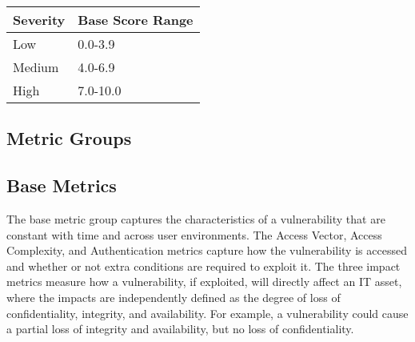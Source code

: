     \begin{longtable}[]{@{}ll@{}}
    \toprule
    \begin{minipage}[b]{0.14\columnwidth}\raggedright\strut
    Severity
    \strut\end{minipage} &
    \begin{minipage}[b]{0.25\columnwidth}\raggedright\strut
    Base Score Range
    \strut\end{minipage}\tabularnewline
    \midrule
    \endhead
    \begin{minipage}[t]{0.14\columnwidth}\raggedright\strut
    Low
    \strut\end{minipage} &
    \begin{minipage}[t]{0.25\columnwidth}\raggedright\strut
    0.0-3.9
    \strut\end{minipage}\tabularnewline
    \begin{minipage}[t]{0.14\columnwidth}\raggedright\strut
    Medium
    \strut\end{minipage} &
    \begin{minipage}[t]{0.25\columnwidth}\raggedright\strut
    4.0-6.9
    \strut\end{minipage}\tabularnewline
    \begin{minipage}[t]{0.14\columnwidth}\raggedright\strut
    High
    \strut\end{minipage} &
    \begin{minipage}[t]{0.25\columnwidth}\raggedright\strut
    7.0-10.0
    \strut\end{minipage}\tabularnewline
    \bottomrule
    \end{longtable}

    \subsection{Metric Groups}\label{subsec:metric-groups}

    \subsection{Base Metrics}\label{subsec:base-metrics}

    The base metric group captures the characteristics of a vulnerability
    that are constant with time and across user environments. The Access
    Vector, Access Complexity, and Authentication metrics capture how the
    vulnerability is accessed and whether or not extra conditions are
    required to exploit it. The three impact metrics measure how a
    vulnerability, if exploited, will directly affect an IT asset, where the
    impacts are independently defined as the degree of loss of
    confidentiality, integrity, and availability. For example, a
    vulnerability could cause a partial loss of integrity and availability,
    but no loss of confidentiality.

